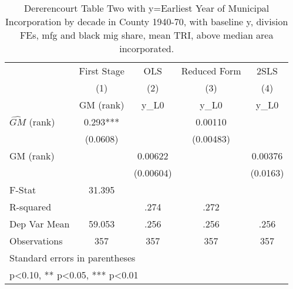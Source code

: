 \begin{table}[htbp]\centering
\def\sym#1{\ifmmode^{#1}\else\(^{#1}\)\fi}
\caption{Dererencourt Table Two with y=Earliest Year of Municipal Incorporation by decade in County 1940-70, with baseline y, division FEs, mfg and black mig share, mean TRI, above median area incorporated.}
\begin{tabular}{l*{4}{c}}
\toprule
                    & First Stage   &         OLS   &Reduced Form   &        2SLS   \\
                    &\multicolumn{1}{c}{(1)}&\multicolumn{1}{c}{(2)}&\multicolumn{1}{c}{(3)}&\multicolumn{1}{c}{(4)}\\
                    &\multicolumn{1}{c}{GM  (rank)}&\multicolumn{1}{c}{y\_L0}&\multicolumn{1}{c}{y\_L0}&\multicolumn{1}{c}{y\_L0}\\
\midrule
$\hat{GM}$ (rank)   &       0.293***&               &     0.00110   &               \\
                    &    (0.0608)   &               &   (0.00483)   &               \\
\addlinespace
GM  (rank)          &               &     0.00622   &               &     0.00376   \\
                    &               &   (0.00604)   &               &    (0.0163)   \\
\midrule
F-Stat              &      31.395   &               &               &               \\
R-squared           &               &        .274   &        .272   &               \\
Dep Var Mean        &      59.053   &        .256   &        .256   &        .256   \\
Observations        &         357   &         357   &         357   &         357   \\
\bottomrule
\multicolumn{5}{l}{\footnotesize Standard errors in parentheses}\\
\multicolumn{5}{l}{\footnotesize * p<0.10, ** p<0.05, *** p<0.01}\\
\end{tabular}
\end{table}
